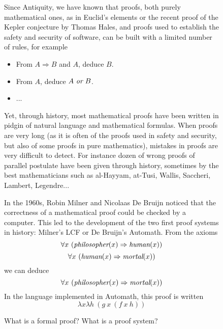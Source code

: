 \begin{figure}
\begin{framed}
Since Antiquity, we have known that
proofs, both purely mathematical ones, as in Euclid's elements or the
recent proof of the Kepler conjecture by Thomas Hales, and proofs used
to establish the safety and security of software, can be built with a
limited number of rules, for example
\begin{itemize}
\item From $A \Rightarrow B$ and $A$, deduce $B$.
\item From $A$, deduce $A~\mbox{\it or}~B$.
\item ...
\end{itemize}
Yet, through history, most mathematical proofs have been written in
pidgin of natural language and mathematical formulas. When proofs are
very long (as it is often of the proofs used in safety and security,
but also of some proofs in pure mathematics), mistakes in proofs are
very difficult to detect. For instance dozen of wrong proofs of
parallel postulate have been given through history, sometimes by the
best mathematicians such as al-Hayyam, at-Tusi, 
Wallis, Saccheri, Lambert, Legendre...

In the 1960s, Robin Milner and Nicolaas De Bruijn noticed that the
correctness of a mathematical proof could be checked by a
computer. This led to the development of the two first proof systems
in history: Milner's {\sf LCF} or De Bruijn's {\sf Automath}.  From
the axioms
$$\forall x~(\mbox{\em philosopher}(x) \Rightarrow \mbox{\em human}(x))$$
$$\forall x~(\mbox{\em human}(x) \Rightarrow \mbox{\em mortal}(x))$$
we can deduce
$$\forall x~(\mbox{\em philosopher}(x) \Rightarrow \mbox{\em mortal}(x))$$
In the language implemented in {\sf Automath}, this proof is written
$$\lambda x \lambda h~(g~x~(f~x~h))$$

\caption{What is a formal proof? What is a proof system?\label{formal}}
\end{framed}
\end{figure}

